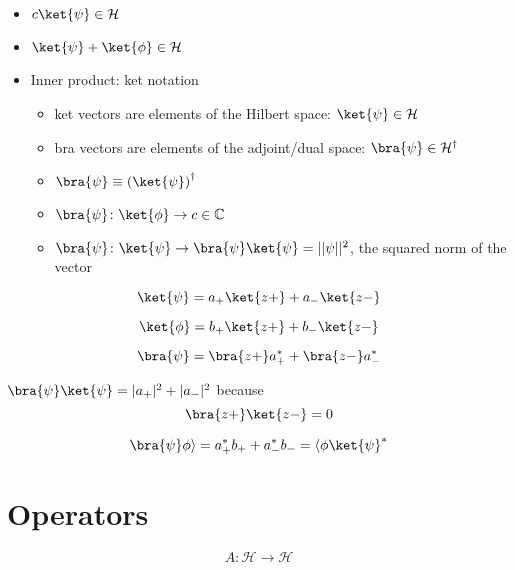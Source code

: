 \documentclass[a4paper,twoside,master.tex]{subfiles}
\begin{document}
\begin{itemize}
\item
  $c\ket{\psi}\in \mathcal{H}$
\item
  $\ket{\psi} + \ket{\phi}\in\mathcal{H}$
\item
  Inner product: ket notation

  \begin{itemize}
  \item
    ket vectors are elements of the Hilbert space:
    $\ket{\psi}\in\mathcal{H}$
  \item
    bra vectors are elements of the adjoint/dual space:
    $\bra{\psi}\in\mathcal{H}^\dagger$
  \item
    $\bra{\psi}\equiv\left(\ket{\psi}\right)^\dagger$
  \item
    $\bra{\psi}\colon\ket{\phi}\to c\in \mathbb{C}$
  \item
    $\bra{\psi}\colon\ket{\psi}\to \bra{\psi}\ket{\psi} = ||\psi||^2$,
    the squared norm of the vector
  \end{itemize}
\end{itemize}

\begin{equation}
\ket{\psi} = a_+\ket{z+} + a_-\ket{z-}
\end{equation}

\begin{equation}
\ket{\phi} = b_+\ket{z+} + b_-\ket{z-}
\end{equation}

\begin{equation}
\bra{\psi} = \bra{ z+}a_+^* + \bra{ z-}a_-^*
\end{equation}

$\bra{\psi}\ket{\psi} = |a_+|^2 + |a_-|^2$ because
\begin{equation}
\bra{ z+}\ket{z-} = 0
\end{equation}

\begin{equation}
\bra{\psi}\phi\rangle= a_+^*b_+ + a_-^*b_- = \langle\phi\ket{\psi}^*
\end{equation}

\section{Operators}
\label{sec:operators}

\begin{equation}
A\colon\mathcal{H}\to\mathcal{H}
\end{equation}
\end{document}
